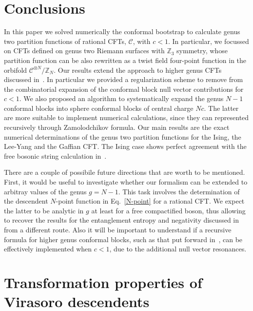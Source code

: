 \documentclass[a4paper,11pt]{article}
\begin{document}
\section{Conclusions}
In this paper we solved numerically the conformal bootstrap to calculate genus two partition functions of rational CFTs, $\mathcal{C}$, with $c<1$. In particular, we focussed on CFTs defined on genus two Riemann surfaces with $\mathbb Z_3$ symmetry, whose partition function can be also rewritten as a twist field four-point function in the orbifold $\mathcal{C}^{\otimes N}/\mathbb Z_N$. Our results extend the approach to higher genus CFTs discussed in~\cite{Cardy, Collier}. In particular we provided a regularization scheme to remove from the combinatorial expansion of the conformal block null vector contributions for $c<1$. We also proposed an algorithm to systematically expand the genus $N-1$ conformal blocks into sphere conformal blocks of central charge $Nc$. The latter are more suitable to implement numerical calculations, since they can represented recursively through Zamolodchikov formula.
Our main results are the exact numerical determinations of the genus two partition functions for the Ising, the Lee-Yang and the Gaffian CFT. The Ising case shows perfect agreement with the free bosonic string calculation in~\cite{Calabrese}.

There are a couple of possibile future directions that are worth to be mentioned. First, it would be useful to investigate whether our formalism can be extended to arbitray values of the genus $g=N-1$. This task involves the determination of the descendent $N$-point function in Eq.~\eqref{N-point} for a rational CFT.  We expect the latter to be analytic in $g$  at least for a free compactified boson, thus allowing to recover the results for the entanglement entropy and negativity discussed in~\cite{Calabrese, Furukawa, Calabrese09, CalabreseNeg, Grava} from a different route.
Also it will be important to understand if a recursive formula for higher genus conformal blocks, such as that put forward in~\cite{Cho}, can be effectively implemented when $c<1$, due to the additional null vector resonances.

\appendix
\section{Transformation properties of Virasoro descendents}\label{app_ward}
\end{document}

